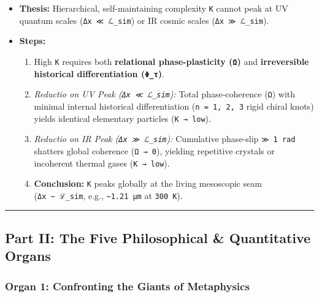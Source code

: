 \documentclass[
]{article}
\begin{document}
\begin{itemize}
\item
  \textbf{Thesis:} Hierarchical, self-maintaining complexity \texttt{K}
  cannot peak at UV quantum scales (\texttt{Δx~≪~ℒ\_sim}) or IR cosmic
  scales (\texttt{Δx~≫~ℒ\_sim}).
\item
  \textbf{Steps:}

  \begin{enumerate}
  \def\labelenumi{\arabic{enumi}.}
  \item
    High \texttt{K} requires both \textbf{relational phase-plasticity
    (\texttt{Ω})} and \textbf{irreversible historical differentiation
    (\texttt{Φ\_τ})}.
  \item
    \emph{Reductio on UV Peak (\texttt{Δx~≪~ℒ\_sim}):} Total
    phase-coherence (\texttt{Ω}) with minimal internal historical
    differentiation (\texttt{n~=~1,~2,~3} rigid chiral knots) yields
    identical elementary particles (\texttt{K~→~low}).
  \item
    \emph{Reductio on IR Peak (\texttt{Δx~≫~ℒ\_sim}):} Cumulative
    phase-slip \texttt{≫~1~rad} shatters global coherence
    (\texttt{Ω~→~0}), yielding repetitive crystals or incoherent thermal
    gases (\texttt{K~→~low}).
  \item
    \textbf{Conclusion:} \texttt{K} peaks globally at the living
    mesoscopic seam (\texttt{Δx~\textasciitilde{}~ℒ\_sim}, e.g.,
    \texttt{\textasciitilde{}1.21~μm} at \texttt{300~K}).
  \end{enumerate}
\end{itemize}

\begin{center}\rule{0.5\linewidth}{0.5pt}\end{center}

\subsection{Part II: The Five Philosophical \& Quantitative
Organs}\label{part-ii-the-five-philosophical-quantitative-organs}

\subsubsection{Organ 1: Confronting the Giants of
Metaphysics}\label{organ-1-confronting-the-giants-of-metaphysics}
\end{document}

